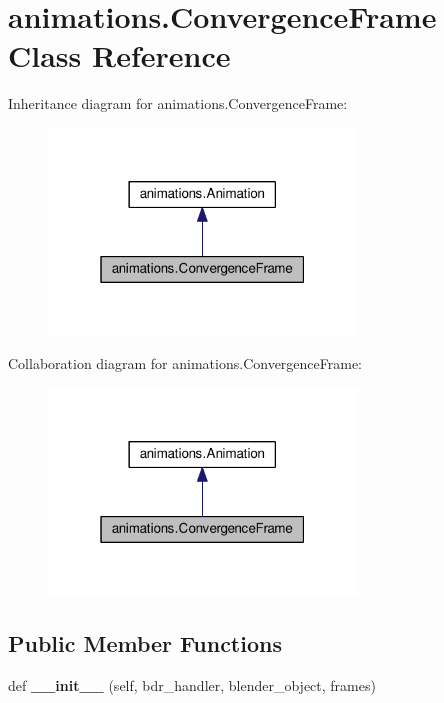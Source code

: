 \hypertarget{classanimations_1_1ConvergenceFrame}{}\section{animations.\+Convergence\+Frame Class Reference}
\label{classanimations_1_1ConvergenceFrame}


Inheritance diagram for animations.\+Convergence\+Frame\+:\nopagebreak
\begin{figure}[H]
\begin{center}
\leavevmode
\includegraphics[width=232pt]{classanimations_1_1ConvergenceFrame__inherit__graph}
\end{center}
\end{figure}


Collaboration diagram for animations.\+Convergence\+Frame\+:\nopagebreak
\begin{figure}[H]
\begin{center}
\leavevmode
\includegraphics[width=232pt]{classanimations_1_1ConvergenceFrame__coll__graph}
\end{center}
\end{figure}
\subsection*{Public Member Functions}
\begin{DoxyCompactItemize}
\item 
def {\bfseries \+\_\+\+\_\+init\+\_\+\+\_\+} (self, bdr\+\_\+handler, blender\+\_\+object, frames)\hypertarget{classanimations_1_1ConvergenceFrame_a8c311e0e9fff583b2cfb7edeee0768ac}{}\label{classanimations_1_1ConvergenceFrame_a8c311e0e9fff583b2cfb7edeee0768ac}

\end{DoxyCompactItemize}
